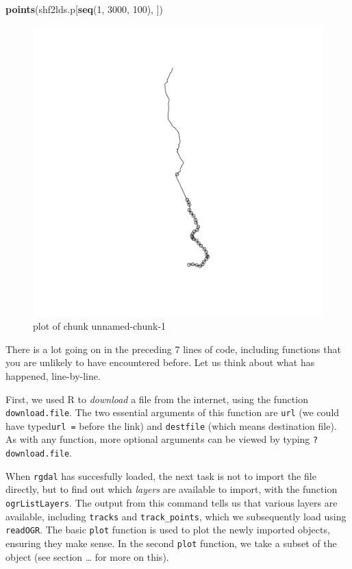 \documentclass[]{article}
\makeatletter
\newenvironment{Shaded}{}{}
\newcommand{\KeywordTok}[1]{\textcolor[rgb]{0.00,0.44,0.13}{\textbf{{#1}}}}
\newcommand{\DecValTok}[1]{\textcolor[rgb]{0.25,0.63,0.44}{{#1}}}
\newcommand{\NormalTok}[1]{{#1}}
\def\maxwidth{\ifdim\Gin@nat@width>\linewidth\linewidth
\else\Gin@nat@width\fi}
\let\Oldincludegraphics\includegraphics
\renewcommand{\includegraphics}[1]{\Oldincludegraphics[width=\maxwidth]{#1}}
\makeatother
\begin{document}
\begin{Shaded}
\begin{Highlighting}[]
\KeywordTok{points}\NormalTok{(shf2lds.p[}\KeywordTok{seq}\NormalTok{(}\DecValTok{1}\NormalTok{, }\DecValTok{3000}\NormalTok{, }\DecValTok{100}\NormalTok{), ])}
\end{Highlighting}
\end{Shaded}

\begin{figure}[htbp]
\centering
\includegraphics{figure/unnamed-chunk-1.png}
\caption{plot of chunk unnamed-chunk-1}
\end{figure}

There is a lot going on in the preceding 7 lines of code, including
functions that you are unlikely to have encountered before. Let us think
about what has happened, line-by-line.

First, we used R to \emph{download} a file from the internet, using the
function \texttt{download.file}. The two essential arguments of this
function are \texttt{url} (we could have typed\texttt{url =} before the
link) and \texttt{destfile} (which means destination file). As with any
function, more optional arguments can be viewed by typing
\texttt{?download.file}.

When \texttt{rgdal} has succesfully loaded, the next task is not to
import the file directly, but to find out which \emph{layers} are
available to import, with the function \texttt{ogrListLayers}. The
output from this command tells us that various layers are available,
including \texttt{tracks} and \texttt{track\_points}, which we
subsequently load using \texttt{readOGR}. The basic \texttt{plot}
function is used to plot the newly imported objects, ensuring they make
sense. In the second \texttt{plot} function, we take a subset of the
object (see section \ldots{} for more on this).
\end{document}
